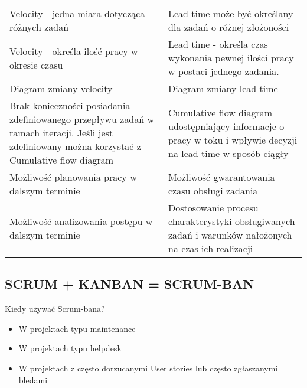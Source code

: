 \documentclass[a4paper]{article}
\begin{document}
\begin{table}[H]
\begin{center}
\begin{tabular}{ | p{8cm} p{8cm} |}
                \cmidrule(r){1-1}\cmidrule(l){2-2}
                Velocity - jedna miara dotycząca różnych zadań
                &
                Lead time może być określany dla zadań o różnej złożoności\\

                \cmidrule(r){1-1}\cmidrule(l){2-2}
                Velocity - określa ilość pracy w okresie czasu
                &
                Lead time - określa czas wykonania pewnej ilości pracy w postaci jednego zadania.\\

                \cmidrule(r){1-1}\cmidrule(l){2-2}
                Diagram zmiany velocity & Diagram zmiany lead time\\

                \cmidrule(r){1-1}\cmidrule(l){2-2}
                Brak konieczności posiadania zdefiniowanego przepływu zadań w ramach iteracji. Jeśli jest zdefiniowany
                można korzystać z Cumulative flow diagram
                &
                Cumulative flow diagram udostępniający informacje o pracy w toku i wpływie decyzji na lead time w sposób ciągły\\

                \cmidrule(r){1-1}\cmidrule(l){2-2}
                Możliwość planowania pracy w dalszym terminie
                &
                Możliwość gwarantowania czasu obsługi zadania\\

                \cmidrule(r){1-1}\cmidrule(l){2-2}
                Możliwość analizowania postępu w dalszym terminie
                &
                Dostosowanie procesu charakterystyki obsługiwanych zadań i warunków nałożonych na czas ich realizacji\\

                \bottomrule
            \end{tabular}
        \end{center}
    \end{table}





    \subsection{SCRUM + KANBAN = SCRUM-BAN}
    Kiedy używać Scrum-bana?
    \begin{itemize}
        \item W projektach typu maintenance
        \item W projektach typu helpdesk
        \item W projektach z często dorzucanymi User stories
        lub często zgłaszanymi bledami
    \end{itemize}
\end{document}

